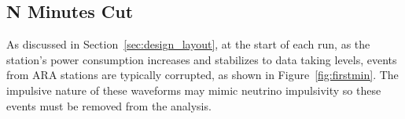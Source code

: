   \subsection{N Minutes Cut}

    As discussed in Section~\ref{sec:design_layout}, at the start of each run, as the station's power consumption increases and stabilizes to data taking levels, events from ARA stations are typically corrupted, as shown in Figure~\ref{fig:firstmin}.
    The impulsive nature of these waveforms may mimic neutrino impulsivity so these events must be removed from the analysis. 
    
  
